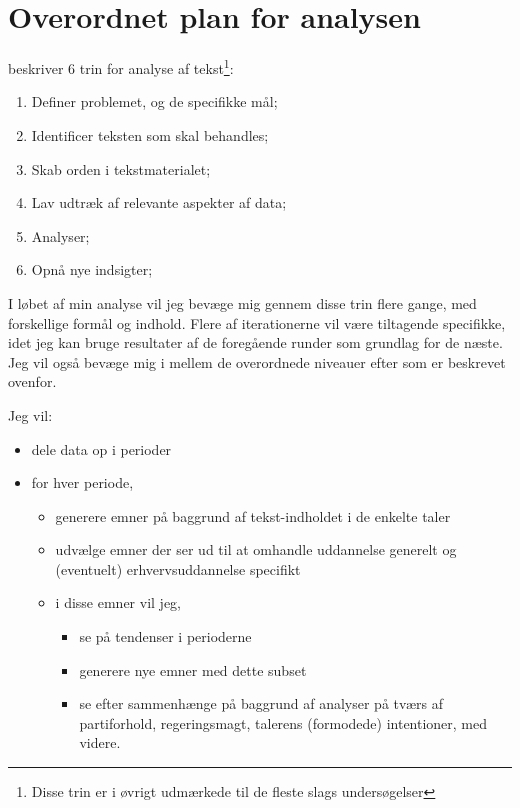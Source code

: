 \section{Overordnet plan for analysen}\label{sec:plan}

\autocite[s. 17]{kwartlerTextMiningPractice2017} beskriver 6 trin for analyse af tekst\footnote{Disse
  trin er i øvrigt udmærkede til de fleste slags undersøgelser}:
\begin{enumerate}
  \item
    Definer problemet, og de specifikke mål;
  \item
    Identificer teksten som skal behandles;
  \item
    Skab orden i tekstmaterialet;
  \item
    Lav udtræk af relevante aspekter af data;
  \item
    Analyser;
  \item
    Opnå nye indsigter;
\end{enumerate}

I løbet af min analyse vil jeg bevæge mig gennem disse trin flere gange, med forskellige formål og indhold.
Flere af iterationerne vil være tiltagende specifikke, idet jeg kan bruge resultater af de foregående runder som grundlag for de næste.
Jeg vil også bevæge mig i mellem de overordnede niveauer efter \autocite{evansMachineTranslationMining2016} som er beskrevet ovenfor.

Jeg vil:

\begin{itemize}
  \item
    dele data op i perioder
  \item
    for hver periode,
    \begin{itemize}
      \item
        generere emner på baggrund af tekst-indholdet i de enkelte taler
      \item
        udvælge emner der ser ud til at omhandle uddannelse generelt og (eventuelt) erhvervsuddannelse specifikt
      \item
        i disse emner vil jeg, 
        \begin{itemize}
          \item
            se på tendenser i perioderne
          \item
            generere nye emner med dette subset
          \item
            se efter sammenhænge på baggrund af analyser på tværs af partiforhold, regeringsmagt, talerens (formodede) intentioner, med videre.
        \end{itemize}
    \end{itemize}
\end{itemize}

